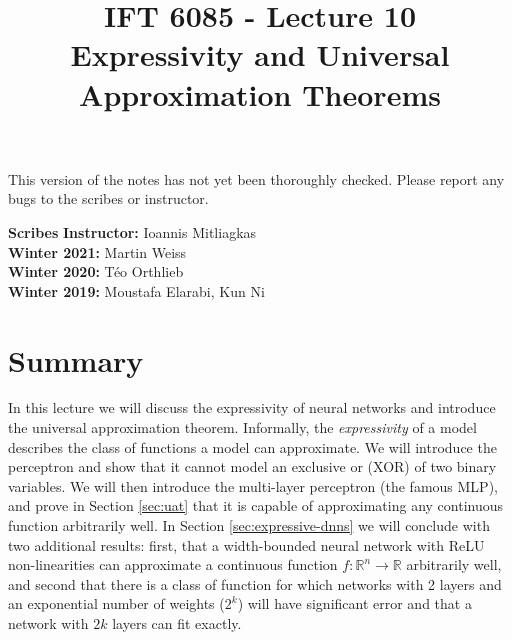 \documentclass{article}
\title{IFT 6085 - Lecture 10 \\ 
Expressivity and Universal Approximation Theorems}
\date{}
\begin{document}
 

\maketitle

\vspace{-0.5in}
\begin{center}
This version of the notes has not yet been thoroughly checked.
Please report any bugs to the scribes or instructor.
\end{center}
\vspace{0.2in}

\textbf{Scribes}\hfill
\textbf{Instructor:}  Ioannis Mitliagkas \\
\textbf{Winter 2021:} Martin Weiss \\
\textbf{Winter 2020:} Téo Orthlieb \\
\textbf{Winter 2019:} Moustafa Elarabi, Kun Ni \\

\newcommand{\infgc}{\inf_{g \in \mathcal{C}}}
\newcommand{\supgc}{\sup_{g \in \mathcal{C}}}
\newcommand{\Prob}{\mathbb{P}}
\newcommand{\E}{\mathbb{E}}
\newcommand{\reals}{\mathbb{R}}


\section{Summary}

In this lecture we will discuss the expressivity of neural networks and introduce the universal approximation theorem. Informally, the \textit{expressivity} of a model describes the class of functions a model can approximate. We will introduce the perceptron and show that it cannot model an exclusive or (XOR) of two binary variables. We will then introduce the multi-layer perceptron (the famous MLP), and prove in Section \ref{sec:uat} that it is capable of approximating any continuous function arbitrarily well. In Section \ref{sec:expressive-dnns} we will conclude with two additional results: first, that a width-bounded neural network with ReLU non-linearities can approximate a continuous function $f: \mathbb{R}^n \to \mathbb{R}$ arbitrarily well, and second that there is a class of function for which networks with 2 layers and an exponential number of weights ($2^k$) will have significant error and that a network with $2k$ layers can fit exactly.
\end{document}
